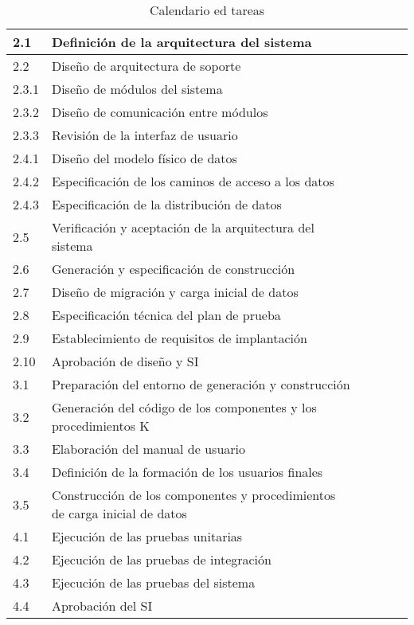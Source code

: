 \documentclass[11pt,a4paper,spanish,twoside]{report}
\begin{document}
\begin{table}[!h]
\begin{tabular}{|p{0.8cm}||p{5cm}||p{1.5cm}|p{1.5cm}|p{1.5cm}|p{1.5cm}|}
      2.1 & Definición de la arquitectura del sistema &  &  &  &  \\
      \hline
      2.2 & Diseño de arquitectura de soporte &  &  &  &  \\
      \hline
      2.3.1 & Diseño de módulos del sistema  &  &  &  &  \\
      \hline
      2.3.2 & Diseño de comunicación entre módulos  &  &  &  &  \\
      \hline
      2.3.3 & Revisión de la interfaz de usuario  &  &  &  &  \\
      \hline
      2.4.1 & Diseño del modelo físico de datos  &  &  &  &  \\
      \hline
      2.4.2 & Especificación de los caminos de acceso a los datos &  &  &  &  \\
      \hline
      2.4.3 & Especificación de la distribución de datos  &  &  &  &  \\
      \hline
      2.5 & Verificación y aceptación de la arquitectura del sistema  &  &  &  &  \\
      \hline
      2.6 & Generación y especificación de construcción &  &  &  &  \\
      \hline
      2.7 & Diseño de migración y carga inicial de datos &  &  &  &  \\
      \hline
      2.8 & Especificación técnica del plan de prueba &  &  &  &  \\
      \hline
      2.9 & Establecimiento de requisitos de implantación &  &  &  &  \\
      \hline
      2.10 & Aprobación de diseño y SI &  &  &  &  \\
      \hline \hline

      3.1 & Preparación del entorno de generación y construcción & & & &\\
      \hline
      3.2 & Generación del código de los componentes y los procedimientos K & & & &\\
      \hline
      3.3 & Elaboración del manual de usuario & & & &\\
      \hline
      3.4 & Definición de la formación de los usuarios finales & & & &\\
      \hline
      3.5 & Construcción de los componentes y procedimientos de carga inicial
      de datos &  &  &  & \\
      \hline \hline

      4.1 & Ejecución de las pruebas unitarias &  &  &  &\\
      \hline
      4.2 & Ejecución de las pruebas de integración &  &  &  & \\
      \hline
      4.3 & Ejecución de las pruebas del sistema &  &  &  &\\
      \hline
      4.4 & Aprobación del SI &  &  &  &\\
      \end{tabular}
      \caption{Calendario ed tareas} \label{Tab:cal}
\end{table}
\end{document}
